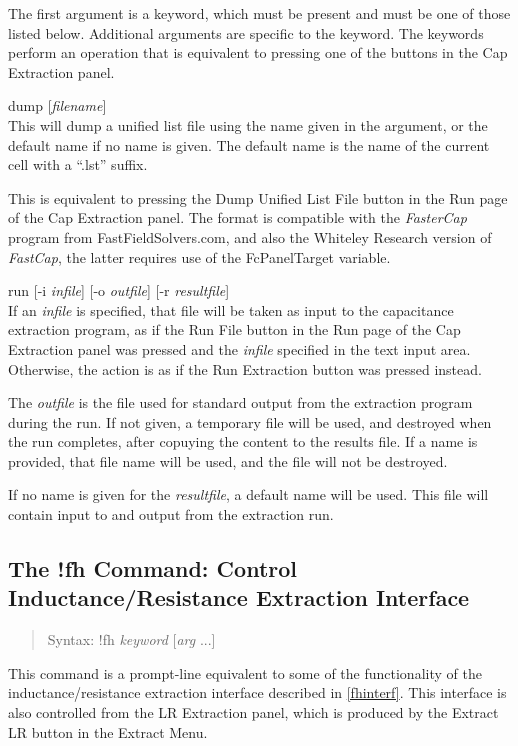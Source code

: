 The first argument is a keyword, which must be present and must be one
of those listed below.  Additional arguments are specific to the
keyword.  The keywords perform an operation that is equivalent to
pressing one of the buttons in the {\cb Cap Extraction} panel.

\begin{description}
\item{\vt dump} [{\it filename\/}]\\
This will dump a unified list file using the name given in the
argument, or the default name if no name is given.  The default name
is the name of the current cell with a ``{\vt .lst}'' suffix.

This is equivalent to pressing the {\cb Dump Unified List File} button
in the {\cb Run} page of the {\cb Cap Extraction} panel.  The format
is compatible with the {\it FasterCap} program from {\et
FastFieldSolvers.com}, and also the Whiteley Research version of {\it
FastCap}, the latter requires use of the {\et FcPanelTarget} variable.

\item{\vt run} [{\vt -i} {\it infile\/}] [{\vt -o} {\it outfile\/}]
 [{\vt -r} {\it resultfile}]\\
If an {\it infile} is specified, that file will be taken as input to
the capacitance extraction program, as if the {\cb Run File} button in
the {\cb Run} page of the {\cb Cap Extraction} panel was pressed and
the {\it infile} specified in the text input area.  Otherwise, the
action is as if the {\cb Run Extraction} button was pressed instead.

The {\it outfile} is the file used for standard output from the
extraction program during the run.  If not given, a temporary file
will be used, and destroyed when the run completes, after copuying the
content to the results file.  If a name is provided, that file name
will be used, and the file will not be destroyed.

If no name is given for the {\it resultfile}, a default name will be
used.  This file will contain input to and output from the extraction
run.
\end{description}

\subsection{The {\cb !fh} Command: Control Inductance/Resistance Extraction
 Interface}
\begin{quote}
Syntax: {\vt !fh} {\it keyword} [{\it arg\/} ...]
\end{quote}
This command is a prompt-line equivalent to some of the functionality
of the inductance/resistance extraction interface described in
\ref{fhinterf}.  This interface is also controlled from the {\cb LR
Extraction} panel, which is produced by the {\cb Extract LR} button in
the {\cb Extract Menu}.

